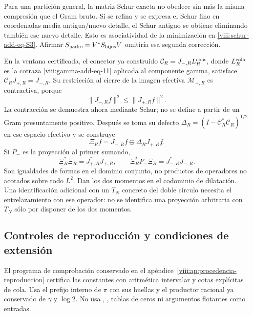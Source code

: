 Para una partición general, la matriz Schur exacta no obedece sin más
la misma compresión que el Gram bruto. Si se refina y se expresa el
Schur fino en coordenadas media antigua/nuevo detalle, el Schur
antiguo se obtiene eliminando también ese nuevo detalle. Esto es
asociatividad de la minimización en \eqref{viii:schur-add-eq-S3}. Afirmar
\(S_{\rm padre}=V^*S_{\rm hijos}V\) omitiría esa segunda corrección.

En la ventana certificada, el conector ya construido
\(\mathcal C_R=J_{-,R}L_R^{\rm cola}\), donde
\(L_R^{\rm cola}\) es la cotraza
\eqref{viii:gamma-add-eq-11} aplicada al componente gamma, satisface
\(\mathcal C_RJ_{+,R}=J_{-,R}\). Su restricción al cierre de la
imagen efectiva \(\mathcal M_{+,R}\) es contractiva, porque
\begin{equation}
\|J_{-,R}f\|^2\leq\|J_{+,R}f\|^2.
\label{viii:schur-add-display-31}
\end{equation}
La contracción se demuestra ahora mediante Schur; no se define a
partir de un Gram presuntamente positivo. Después se toma su defecto
\(\Delta_R=(I-\mathcal C_R^*\mathcal C_R)^{1/2}\) en ese espacio
efectivo y se construye
\begin{equation}
\Xi_Rf=J_{-,R}f\oplus\Delta_RJ_{+,R}f.
\label{viii:schur-add-display-32}
\end{equation}
Si \(P_-\) es la proyección al primer sumando,
\begin{equation}
\Xi_R^*\Xi_R=J_{+,R}^*J_{+,R},\qquad
\Xi_R^*P_-\Xi_R=J_{-,R}^*J_{-,R}.
\label{viii:schur-add-display-33}
\end{equation}
Son igualdades de formas en el dominio conjunto, no productos de
operadores no acotados sobre todo \(L^2\). Dan los dos momentos en
el codominio de dilatación. Una identificación adicional con un
\(T_N\) concreto del doble círculo necesita el entrelazamiento
con ese operador: no se identifica una proyección arbitraria con
\(T_N\) sólo por disponer de los dos momentos.

\subsection{Controles de reproducción y condiciones de extensión}
\label{viii:schur-add-sub-411}

El programa de comprobación conservado en el
apéndice~\ref{viii:ap:procedencia-reproduccion} certifica las constantes con aritmética intervalar y cotas explícitas
de cola. Usa el prefijo interno de \(\pi\) con sus huellas y el productor
racional ya conservado de \(\gamma\) y \(\log2\). No usa \texttt{},
\texttt{}, tablas de ceros ni argumentos flotantes como entradas.

